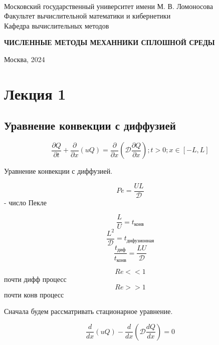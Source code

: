 \documentclass[12pt, a4paper]{article}
\begin{document}
\thispagestyle{empty}

\begin{center}
	\ \vspace{-1cm}
	
	{Московский государственный университет имени М. В. Ломоносова}\\
	Факультет вычислительной математики и кибернетики\\
	Кафедра вычислительных методов
	
	\vspace{8cm}
	\begin{spacing}{2.5}
		{\huge \bfseries ЧИСЛЕННЫЕ МЕТОДЫ МЕХАННИКИ СПЛОШНОЙ СРЕДЫ}
	\end{spacing}
	

\end{center}

\vfill

\begin{center}
	Москва, 2024
\end{center}

\enlargethispage{2\baselineskip}

\newpage

\tableofcontents

\newpage

\section{Лекция 1}

\subsection{Уравнение конвекции с диффузией}

\[ \frac{\partial Q}{\partial t} +\frac{\partial }{\partial x} (u Q) = \frac{\partial }{\partial x} (\mathcal{D} \frac{\partial Q}{\partial x}); t>0; x \in [-L, L] \]

Уравнение конвекции с диффузией.

\[ Pe = \frac{UL}{\mathcal{D}} \] - число Пекле

\[ \frac{L}{U} = t_{\textrm{конв}} \]
\[ \frac{L^2}{\mathcal{D}} = t_{\textrm{дифузионная}} \]
\[ \frac{t_{\textrm{диф}}}{t_{\textrm{конв}}} = \frac{L U}{\mathcal{D}} \]

\[ Re << 1 \] почти дифф процесс
\[ Re >> 1 \] почти конв процесс

Сначала будем рассматривать стационарное уравнение. 

\[ \frac{d}{dx}(uQ) - \frac{d}{dx} (\mathcal{D} \frac{d Q}{d x}) = 0 \]
\end{document}
